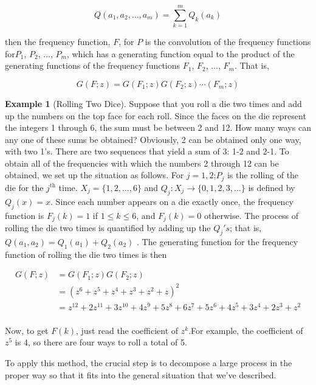 \documentclass[10pt,]{book}
\theoremstyle{plain}
\theoremstyle{definition}
\theoremstyle{definition}
\theoremstyle{definition}
\newtheorem{example}[theorem]{Example}
\theoremstyle{definition}
\numberwithin{equation}{section}
\begin{document}
 \[Q(a_1,a_2, \ldots , a_m)= \sum_{k=1}^m Q_k(a_k)\]



then the frequency function, \(F\), for \(P\) is the convolution of the frequency functions for\(P_1\), \(P_2\), \(\ldots\), \(P_m\),
which has a generating function equal to the product of the generating functions of the frequency functions \(F_1\), \(F_2\), \(\ldots\), \(F_m\).  That is,

\begin{equation*}
G(F;z) =G(F_1;z)G(F_2;z) \cdots (F_m;z)
\end{equation*}

%
\begin{example}[Rolling Two Dice]\label{ex-dice-roll}
 Suppose that you roll a die two times and add up the numbers on the top face for each roll. Since the faces on the die represent
the integers 1 through 6, the sum must be between 2 and 12. How many ways can any one of these sums be obtained? Obviously, 2 can be obtained only
one way, with two 1's. There are two sequences that yield a sum of 3: 1-2 and 2-1. To obtain all of the frequencies with which the numbers 2 through
12 can be obtained, we set up the situation as follows. For \(j = 1, 2\);\(P_j\) is the rolling of the die for the \(j^{\text{th}}\) time. \(X_j
= \{1, 2, . . . , 6\}\) and \(Q_j : X_j \rightarrow \{0, 1, 2, 3,\ldots \}\) is defined by \(Q_j(x) = x\). Since each number appears on a die exactly once,
the frequency function is \(F_j(k)=1\) if \(1 \leq  k \leq  6\), and \(F_j(k) = 0\) otherwise. The process of rolling the die two times is quantified
by adding up the \(Q_j's\); that is, \(Q(a_1, a_2) =Q_{1}(a_1)+Q_2(a_2)\) . The generating function for the
frequency function of rolling the die two times is then

\begin{equation*}
\begin{split}
G(F; z) & = G(F_1;z)G(F_2;z)\\
		&  = (z^6+z^5+z^4+z^3+z^2+z)^2\\
		& =z^{12}+2 z^{11}+3 z^{10}+4 z^9+5 z^8+6 z^7+5 z^6+4 z^5+3 z^4+2
z^3+z^2\\
\end{split}
\end{equation*}
%
\par
Now, to get \(F(k)\), just read the coefficient of \(z^k\).For example, the coefficient of \(z^5\) is 4, so there are four ways to roll a total
of 5.%
\par
To apply this method, the crucial step is to decompose a large process in the proper way so that it fits into the general situation that we've described.
%
\end{example}
\end{document}

